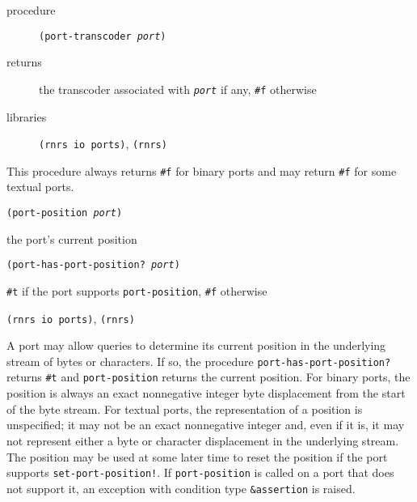 \begin{description}

\label{io_s48}\item[procedure] \texttt{(port-transcoder \textit{port})}



\item[returns] the transcoder associated with \texttt{\textit{port}} if any, \texttt{\#{}f} otherwise


\item[libraries] \texttt{(rnrs io ports)}, \texttt{(rnrs)}
\end{description}


This procedure always returns \texttt{\#{}f} for binary ports and may return
\texttt{\#{}f} for some textual ports.


\begin{description}

\label{io_s49}\item[procedure] \texttt{(port-position \textit{port})}



\item[returns] the port's current position


\item[procedure] \texttt{(port-has-port-position? \textit{port})}



\item[returns] \texttt{\#{}t} if the port supports \texttt{port-position}, \texttt{\#{}f} otherwise


\item[libraries] \texttt{(rnrs io ports)}, \texttt{(rnrs)}
\end{description}


A port may allow queries to determine its current position in
the underlying stream of bytes or characters.
If so, the procedure \texttt{port-has-port-position?} returns
\texttt{\#{}t} and \texttt{port-position} returns the current position.
For binary ports, the position is always an exact nonnegative integer byte
displacement from the start of the byte stream.
For textual ports, the representation of a position is unspecified; it
may not be an exact nonnegative integer and, even if it is, it may not
represent either a byte or character displacement in the underlying stream.
The position may be used at some later time to reset the position if the
port supports \texttt{set-port-position!}.
If \texttt{port-position} is called on a port that does not support it,
an exception with condition type \texttt{\&{}assertion} is raised.


